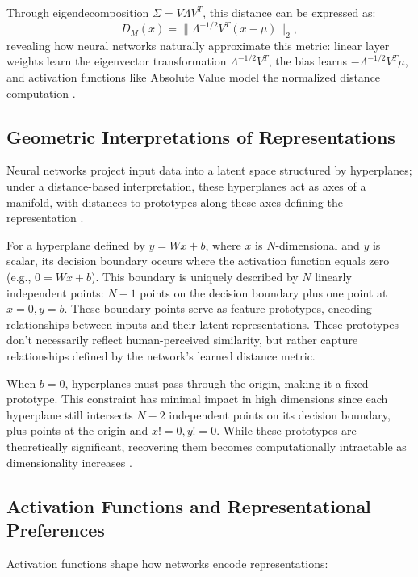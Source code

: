 Through eigendecomposition $\Sigma = V\Lambda V^T$, this distance can be expressed as:
\begin{equation}
    D_M(x) = \| \Lambda^{-1/2} V^T (x - \mu) \|_2,
\end{equation}
revealing how neural networks naturally approximate this metric: linear layer weights learn the eigenvector transformation $\Lambda^{-1/2} V^T$, the bias learns $-\Lambda^{-1/2} V^T \mu$, and activation functions like Absolute Value model the normalized distance computation \cite{oursland2024interpreting}.

\subsection{Geometric Interpretations of Representations}

Neural networks project input data into a latent space structured by hyperplanes; under a distance-based interpretation, these hyperplanes act as axes of a manifold, with distances to prototypes along these axes defining the representation \cite{montavon2018methods}.

For a hyperplane defined by $y = Wx + b$, where $x$ is $N$-dimensional and $y$ is scalar, its decision boundary occurs where the activation function equals zero (e.g., $0 = Wx + b$). This boundary is uniquely described by $N$ linearly independent points: $N-1$ points on the decision boundary plus one point at ${x=0, y=b}$. These boundary points serve as feature prototypes, encoding relationships between inputs and their latent representations. These prototypes don't necessarily reflect human-perceived similarity, but rather capture relationships defined by the network's learned distance metric.

When $b=0$, hyperplanes must pass through the origin, making it a fixed prototype. This constraint has minimal impact in high dimensions since each hyperplane still intersects $N-2$ independent points on its decision boundary, plus points at the origin and ${x!=0, y!=0}$. While these prototypes are theoretically significant, recovering them becomes computationally intractable as dimensionality increases \cite{donoho2000high}.

\subsection{Activation Functions and Representational Preferences}

Activation functions shape how networks encode representations:

